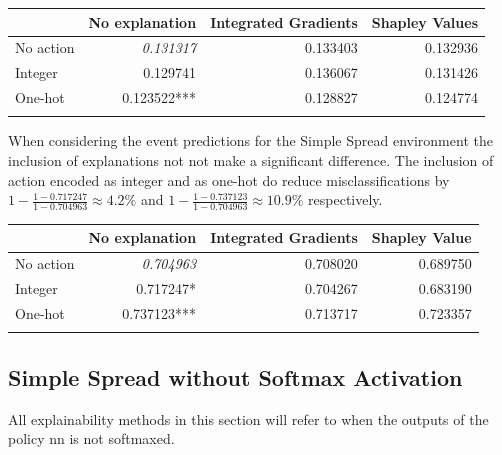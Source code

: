 \documentclass[UKenglish]{uiomasterthesis}
\begin{document}
\begin{center}
\label{tab:state_simpl}
\begin{tabular}{lrrr}
\toprule
& No explanation & Integrated Gradients & Shapley Values \\
\midrule
No action & \textit{0.131317} & 0.133403 & 0.132936 \\
Integer & 0.129741 & 0.136067 & 0.131426 \\
One-hot & 0.123522*** & 0.128827 & 0.124774 \\
\bottomrule
\addlinespace[2pt]
\multicolumn{3}{l}{\textsuperscript{***}$p<0.001$, 
  \textsuperscript{**}$p<0.01$, 
  \textsuperscript{*}$p<0.05$}
\end{tabular}
\end{center}

When considering the event predictions for the Simple Spread environment the inclusion of explanations not not make a significant difference. The inclusion of action encoded as integer and as one-hot do reduce misclassifications by $1-\frac{1-0.717247}{1-0.704963} \approx 4.2\%$ and $1-\frac{1-0.737123}{1-0.704963} \approx 10.9\%$ respectively.

\begin{center}
\label{tab:crit_simpl}
\begin{tabular}{lrrr}
\toprule
 & No explanation & Integrated Gradients & Shapley Value \\
 \midrule
    No action & \textit{0.704963} & 0.708020 & 0.689750 \\
Integer & 0.717247* & 0.704267 & 0.683190 \\
One-hot & 0.737123*** & 0.713717 & 0.723357 \\
\bottomrule
\addlinespace[2pt]
\multicolumn{3}{l}{\textsuperscript{***}$p<0.001$, 
  \textsuperscript{**}$p<0.01$, 
  \textsuperscript{*}$p<0.05$}
\end{tabular}
\end{center}

\subsection{Simple Spread without Softmax Activation}
\label{sec:simpl_no_sm}
All explainability methods in this section will refer to when the outputs of the policy \ac{nn} is not softmaxed.
\end{document}
